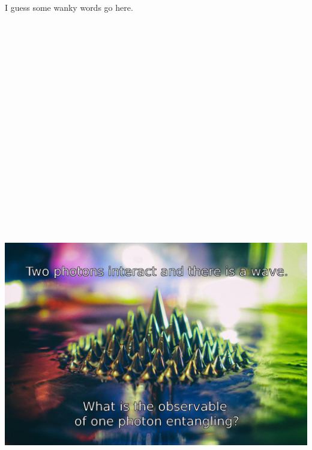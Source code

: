 \documentclass{book}
\begin{document}
	\newpage
	\raggedleft
	I guess some wanky words go here.
	\includegraphics[height=30cm]{images/koan2.jpg}
\end{document}
